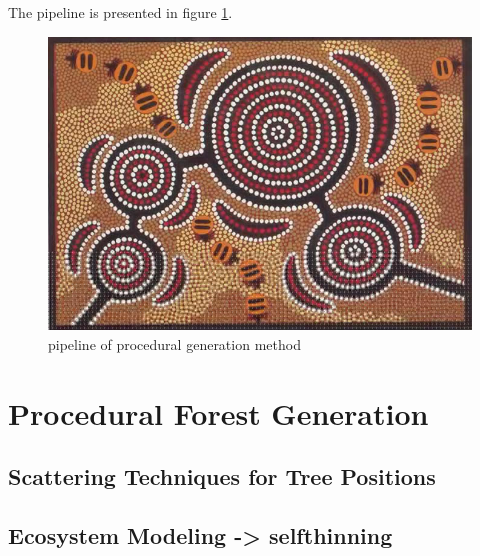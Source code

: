 \documentclass{article}
\begin{document}
The pipeline is presented in figure \ref{fig:pipeline}.

\begin{figure}[htbp]
	\centering
		\includegraphics{images/aboriginal_art.jpg}
	\caption{pipeline of procedural generation method}
	\label{fig:pipeline}
\end{figure}




\section{Procedural Forest Generation}
\label{sec:pfg}



\subsection{Scattering Techniques for Tree Positions}
\label{subsec:scattering}


%


\subsection{Ecosystem Modeling -> selfthinning}
\end{document}
